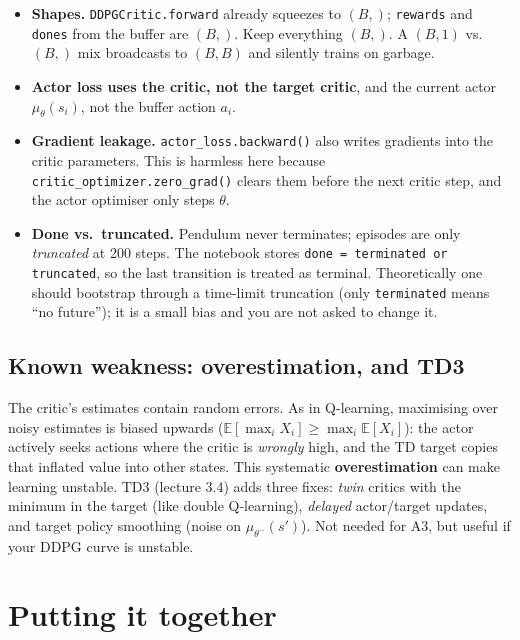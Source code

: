 \documentclass[11pt,a4paper]{article}
\newcommand{\E}{\mathbb{E}}
\newcommand{\code}[1]{\texttt{#1}}
\begin{document}
\begin{pitfall}
\begin{itemize}[nosep,leftmargin=*]
  \item \textbf{Shapes.} \code{DDPGCritic.forward} already squeezes to $(B,)$; \code{rewards} and \code{dones} from the buffer are $(B,)$. Keep everything $(B,)$. A $(B,1)$ vs.\ $(B,)$ mix broadcasts to $(B,B)$ and silently trains on garbage.
  \item \textbf{Actor loss uses the critic, not the target critic}, and the current actor $\mu_\theta(s_i)$, not the buffer action $a_i$.
  \item \textbf{Gradient leakage.} \code{actor\_loss.backward()} also writes gradients into the critic parameters. This is harmless here because \code{critic\_optimizer.zero\_grad()} clears them before the next critic step, and the actor optimiser only steps $\theta$.
  \item \textbf{Done vs.\ truncated.} Pendulum never terminates; episodes are only \emph{truncated} at 200 steps. The notebook stores \code{done = terminated or truncated}, so the last transition is treated as terminal. Theoretically one should bootstrap through a time-limit truncation (only \code{terminated} means \enquote{no future}); it is a small bias and you are not asked to change it.
\end{itemize}
\end{pitfall}

\subsection{Known weakness: overestimation, and TD3}
The critic's estimates contain random errors. As in Q-learning, maximising over noisy estimates is biased upwards ($\E[\max_i X_i]\ge\max_i\E[X_i]$): the actor actively seeks actions where the critic is \emph{wrongly} high, and the TD target copies that inflated value into other states. This systematic \textbf{overestimation} can make learning unstable. TD3 (lecture 3.4) adds three fixes: \emph{twin} critics with the minimum in the target (like double Q-learning), \emph{delayed} actor/target updates, and target policy smoothing (noise on $\mu_{\theta^-}(s')$). Not needed for A3, but useful if your DDPG curve is unstable.

\section{Putting it together}\label{sec:summary}
\end{document}
